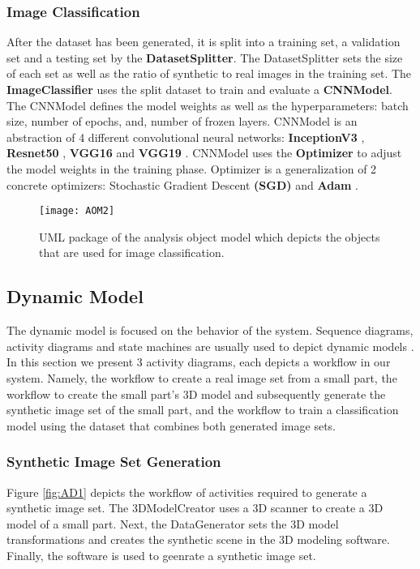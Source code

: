 \subsubsection{Image Classification}
After the dataset has been generated, it is split into a training set, a validation set and a testing set by the \textbf{DatasetSplitter}. The DatasetSplitter sets the size of each set as well as the ratio of synthetic to real images in the training set. The \textbf{ImageClassifier} uses the split dataset to train and evaluate a \textbf{CNNModel}. The CNNModel defines the model weights as well as the hyperparameters: batch size, number of epochs, and, number of frozen layers. CNNModel is an abstraction of 4 different convolutional neural networks: \textbf{InceptionV3} \cite{szegedy2016rethinking}, \textbf{Resnet50} \cite{he2016deep}, \textbf{VGG16} \cite{simonyan2014very} and \textbf{VGG19} \cite{simonyan2014very}. CNNModel uses the \textbf{Optimizer} to adjust the model weights in the training phase. Optimizer is a generalization of 2 concrete optimizers: Stochastic Gradient Descent \textbf{(SGD)} and \textbf{Adam} \cite{kingma2014adam}.

\begin{figure}[H]
\centering
  \texttt{[image: AOM2]}
\caption{UML package of the analysis object model which depicts the objects that are used for image classification.}
\label{fig:AOM2}
\end{figure}

\newpage
\subsection{Dynamic Model}\label{dynamic_model}
The dynamic model is focused on the behavior of the system. Sequence diagrams, activity diagrams and state machines are usually used to depict dynamic models \cite{bruegge2004object}. In this section we present 3 activity diagrams, each depicts a workflow in our system. Namely, the workflow to create a real image set from a small part, the workflow to create the small part's 3D model and subsequently generate the synthetic image set of the small part, and the workflow to train a classification model using the dataset that combines both generated image sets.

\subsubsection{Synthetic Image Set Generation}
Figure \ref{fig:AD1} depicts the workflow of activities required to generate a synthetic image set. The 3DModelCreator uses a 3D scanner to create a 3D model of a small part. Next, the DataGenerator sets the 3D model transformations and creates the synthetic scene in the 3D modeling software. Finally, the software is used to geenrate a synthetic image set.

